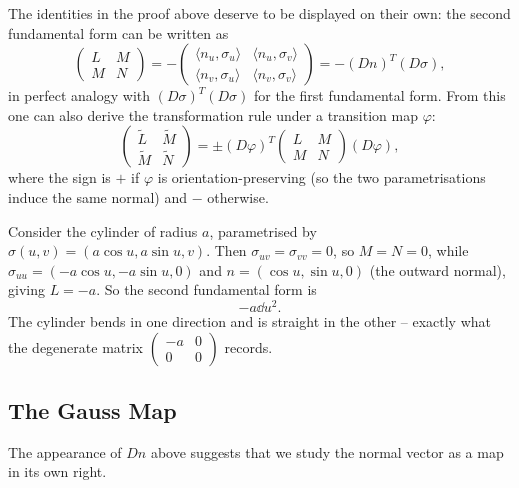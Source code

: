 \documentclass[a4paper]{scrartcl}
\begin{document}
The identities in the proof above deserve to be displayed on their own: the second fundamental form can be written as
$$
\begin{pmatrix} L & M \\ M & N \end{pmatrix} = -\begin{pmatrix} \langle n_u , \sigma_u \rangle & \langle n_u, \sigma_v \rangle \\ \langle n_v, \sigma_u \rangle & \langle n_v, \sigma_v \rangle \end{pmatrix} = -(Dn)^T (D\sigma),
$$
in perfect analogy with $(D\sigma)^T(D\sigma)$ for the first fundamental form. From this one can also derive the transformation rule under a transition map $\varphi$:
$$
\begin{pmatrix} \tilde L & \tilde M \\ \tilde M & \tilde N \end{pmatrix} = \pm (D\varphi)^T \begin{pmatrix} L & M \\ M & N\end{pmatrix} (D\varphi),
$$
where the sign is $+$ if $\varphi$ is orientation-preserving (so the two parametrisations induce the same normal) and $-$ otherwise.

\begin{example}
    Consider the cylinder of radius $a$, parametrised by $\sigma(u, v) = (a \cos u, a \sin u, v)$. Then $\sigma_{uv} = \sigma_{vv} = 0$, so $M = N = 0$, while $\sigma_{uu} = (-a\cos u, -a \sin u, 0)$ and $n = (\cos u, \sin u, 0)$ (the outward normal), giving $L = -a$. So the second fundamental form is
    $$
    -a \dd u^2.
    $$
    The cylinder bends in one direction and is straight in the other -- exactly what the degenerate matrix $\begin{pmatrix} -a & 0 \\ 0 & 0\end{pmatrix}$ records.
\end{example}

\subsection{The Gauss Map}

The appearance of $Dn$ above suggests that we study the normal vector as a map in its own right.
\end{document}
